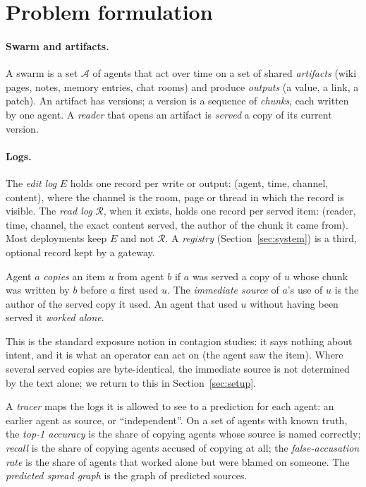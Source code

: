 \section{Problem formulation}\label{sec:problem}

\paragraph{Swarm and artifacts.}
A swarm is a set $\mathcal{A}$ of agents that act over time on a set of shared \emph{artifacts} (wiki pages, notes, memory entries, chat rooms) and produce \emph{outputs} (a value, a link, a patch). An artifact has versions; a version is a sequence of \emph{chunks}, each written by one agent. A \emph{reader} that opens an artifact is \emph{served} a copy of its current version.

\paragraph{Logs.}
The \emph{edit log} $E$ holds one record per write or output: (agent, time, channel, content), where the channel is the room, page or thread in which the record is visible. The \emph{read log} $\mathcal{R}$, when it exists, holds one record per served item: (reader, time, channel, the exact content served, the author of the chunk it came from). Most deployments keep $E$ and not $\mathcal{R}$. A \emph{registry} (Section~\ref{sec:system}) is a third, optional record kept by a gateway.

\begin{definition}\label{def:copy}
Agent $a$ \emph{copies} an item $u$ from agent $b$ if $a$ was served a copy of $u$ whose chunk was written by $b$ before $a$ first used $u$. The \emph{immediate source} of $a$'s use of $u$ is the author of the served copy it used. An agent that used $u$ without having been served it \emph{worked alone}.
\end{definition}
This is the standard exposure notion in contagion studies: it says nothing about intent, and it is what an operator can act on (the agent saw the item). Where several served copies are byte-identical, the immediate source is not determined by the text alone; we return to this in Section~\ref{sec:setup}.

\begin{definition}\label{def:tracer}
A \emph{tracer} maps the logs it is allowed to see to a prediction for each agent: an earlier agent as source, or ``independent''. On a set of agents with known truth, the \emph{top-1 accuracy} is the share of copying agents whose source is named correctly; \emph{recall} is the share of copying agents accused of copying at all; the \emph{false-accusation rate} is the share of agents that worked alone but were blamed on someone. The \emph{predicted spread graph} is the graph of predicted sources.
\end{definition}

